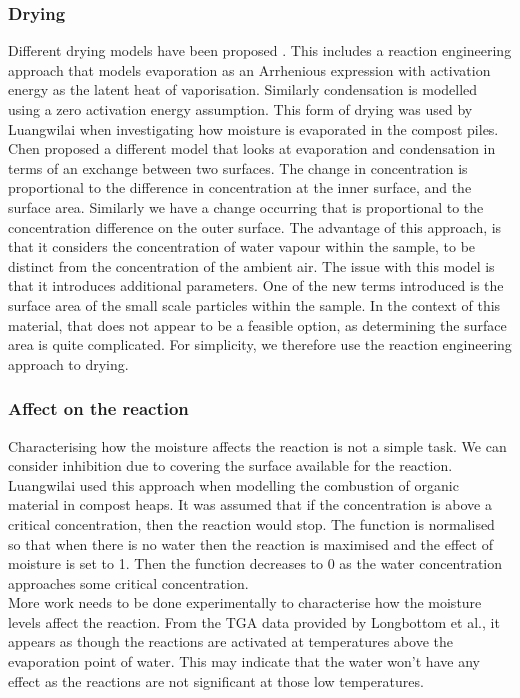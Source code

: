 \subsubsection{Drying}
Different drying models have been proposed \cite{chen98}. This includes a reaction engineering approach that models evaporation as an Arrhenious expression with activation energy as the latent heat of vaporisation. Similarly condensation is modelled using a zero activation energy assumption. This form of drying was used by Luangwilai \cite{luang11} when investigating how moisture is evaporated in the compost piles.\\
Chen \cite{chen98} proposed a different model that looks at evaporation and condensation in terms of an exchange between two surfaces. The change in concentration is proportional to the difference in concentration at the inner surface, and the surface area. Similarly we have a change occurring that is proportional to the concentration difference on the outer surface. The advantage of this approach, is that it considers the concentration of water vapour within the sample, to be distinct from the concentration of the ambient air. The issue with this model is that it introduces additional parameters. One of the new terms introduced is the surface area of the small scale particles within the sample. In the context of this material, that does not appear to be a feasible option, as determining the surface area is quite complicated. For simplicity, we therefore use the reaction engineering approach to drying.

\subsubsection{Affect on the reaction}
Characterising how the moisture affects the reaction is not a simple task. We can consider inhibition due to covering the surface available for the reaction. Luangwilai \cite{luang11} used this approach when modelling the combustion of organic material in compost heaps. It was assumed that if the concentration is above a critical concentration, then the reaction would stop. The function is normalised so that when there is no water then the reaction is maximised and the effect of moisture is set to 1. Then the function decreases to 0 as the water concentration approaches some critical concentration. \\
More work needs to be done experimentally to characterise how the moisture levels affect the reaction. From the TGA data provided by Longbottom et al.\cite{Ray19}, it appears as though the reactions are activated at temperatures above the evaporation point of water. This may indicate that the water won't have any effect as the reactions are not significant at those low temperatures.



